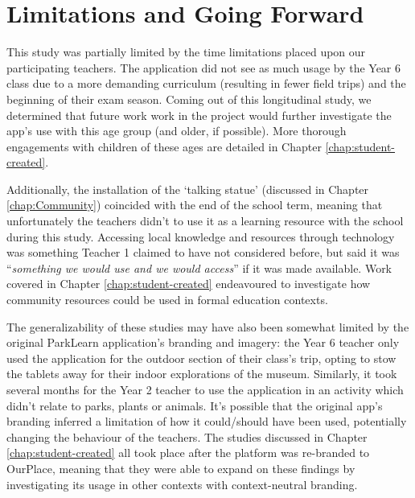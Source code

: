 \section{Limitations and Going Forward}

This study was partially limited by the time limitations placed upon our participating teachers. The application did not see as much usage by the Year 6 class due to a more demanding curriculum (resulting in fewer field trips) and the beginning of their exam season. Coming out of this longitudinal study, we determined that future work work in the project would further investigate the app’s use with this age group (and older, if possible). More thorough engagements with children of these ages are detailed in Chapter \ref{chap:student-created}.

Additionally, the installation of the ‘talking statue’ (discussed in Chapter \ref{chap:Community}) coincided with the end of the school term, meaning that unfortunately the teachers didn't to use it as a learning resource with the school during this study. Accessing local knowledge and resources through technology was something Teacher 1 claimed to have not considered before, but said it was “\textit{something we would use and we would access}” if it was made available. Work covered in Chapter \ref{chap:student-created} endeavoured to investigate how community resources could be used in formal education contexts. 

The generalizability of these studies may have also been somewhat limited by the original ParkLearn application's branding and imagery: the Year 6 teacher only used the application for the outdoor section of their class’s trip, opting to stow the tablets away for their indoor explorations of the museum. Similarly, it took several months for the Year 2 teacher to use the application in an activity which didn’t relate to parks, plants or animals. It's possible that the original app's branding inferred a limitation of how it could/should have been used, potentially changing the behaviour of the teachers. The studies discussed in Chapter \ref{chap:student-created} all took place after the platform was re-branded to OurPlace, meaning that they were able to expand on these findings by investigating its usage in other contexts with context-neutral branding.

